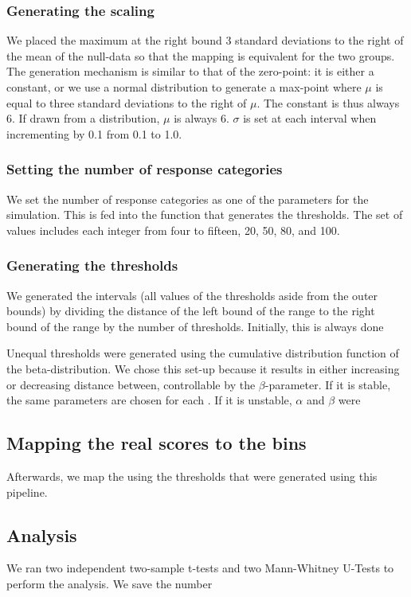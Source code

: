 \documentclass[utf8]{FrontiersinVancouver}
\begin{document}
\subsubsection{Generating the scaling}
We placed the maximum at the right bound 3 standard deviations to the right of the mean of the null-data so that the mapping is equivalent for the two groups. The generation mechanism is similar to that of the zero-point: it is either a constant, or we use a normal distribution to generate a max-point where $\mu$ is equal to three standard deviations to the right of $\mu$. The constant is thus always 6. If drawn from a distribution, $\mu$ is always 6. $\sigma$ is set at each interval when incrementing by 0.1 from 0.1 to 1.0.

\subsubsection{Setting the number of response categories}
We set the number of response categories as one of the parameters for the simulation. This is fed into the function that generates the thresholds. The set of values includes each integer from four to fifteen, 20, 50, 80, and 100.

\subsubsection{Generating the thresholds}
We generated the intervals (all values of the thresholds aside from the outer bounds) by dividing the distance of the left bound of the range to the right bound of the range by the number of thresholds. Initially, this is always done 

Unequal thresholds were generated using the cumulative distribution function of the beta-distribution. We chose this set-up because it results in either increasing or decreasing distance between, controllable by the $\beta$-parameter. If it is stable, the same parameters are chosen for each . If it is unstable, $\alpha$ and $\beta$ were 

\subsection{Mapping the real scores to the bins}
Afterwards, we map the using the thresholds that were generated using this pipeline. 

\subsection{Analysis}
We ran two independent two-sample t-tests and two Mann-Whitney U-Tests to perform the analysis. We save the number 
\end{document}

